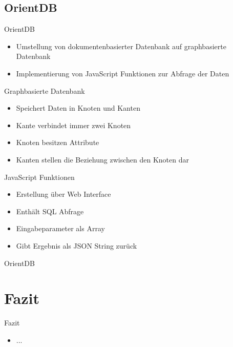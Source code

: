 \documentclass[aspectratio=169]{beamer}
\begin{document}
\subsection{OrientDB}

\begin{frame}{OrientDB}
  \begin{itemize}
  	\item Umstellung von dokumentenbasierter Datenbank auf graphbasierte Datenbank
  	\item Implementierung von JavaScript Funktionen zur Abfrage der Daten
  \end{itemize}
\end{frame}

\begin{frame}{Graphbasierte Datenbank}
  \begin{itemize}
  	\item Speichert Daten in Knoten und Kanten
  	\item Kante verbindet immer zwei Knoten
  	\item Knoten besitzen Attribute
  	\item Kanten stellen die Beziehung zwischen den Knoten dar
  \end{itemize}
\end{frame}

\begin{frame}{JavaScript Funktionen}
  \begin{itemize}
  	\item Erstellung über Web Interface
  	\item Enthält SQL Abfrage
  	\item Eingabeparameter als Array
  	\item Gibt Ergebnis als JSON String zurück
  \end{itemize}
\end{frame}

\begin{frame}{OrientDB}
\end{frame}

\section{Fazit}

\begin{frame}{Fazit}
  \begin{itemize}
  	\item ...
  \end{itemize}
\end{frame}
\end{document}
